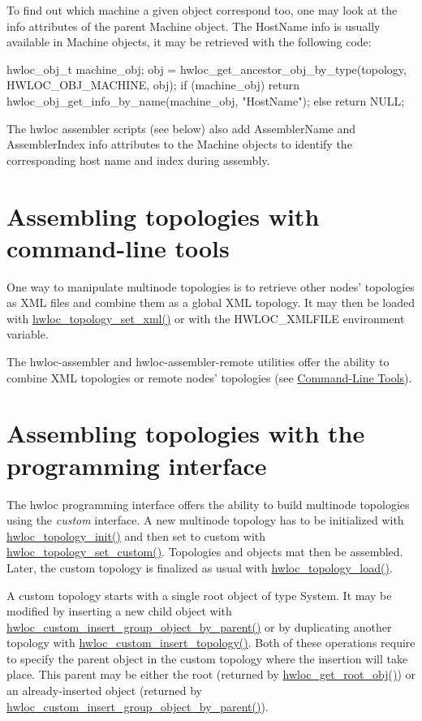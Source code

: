 To find out which machine a given object correspond too, one may look at the info attributes of the parent Machine object. The {\ttfamily HostName} info is usually available in Machine objects, it may be retrieved with the following code: \begin{DoxyVerb}
  hwloc_obj_t machine_obj;
  obj = hwloc_get_ancestor_obj_by_type(topology, HWLOC_OBJ_MACHINE, obj);
  if (machine_obj)
    return hwloc_obj_get_info_by_name(machine_obj, "HostName");
  else
    return NULL;
\end{DoxyVerb}
 The hwloc assembler scripts (see below) also add {\ttfamily AssemblerName} and {\ttfamily AssemblerIndex} info attributes to the Machine objects to identify the corresponding host name and index during assembly.\hypertarget{a00006_multinode_tools}{}\section{Assembling topologies with command-\/line tools}\label{a00006_multinode_tools}
One way to manipulate multinode topologies is to retrieve other nodes' topologies as XML files and combine them as a global XML topology. It may then be loaded with \hyperlink{a00044_ga93efcc8a962afe1ed23393700682173f}{hwloc\_\-topology\_\-set\_\-xml()} or with the HWLOC\_\-XMLFILE environment variable.

The hwloc-\/assembler and hwloc-\/assembler-\/remote utilities offer the ability to combine XML topologies or remote nodes' topologies (see \hyperlink{a00002}{Command-\/Line Tools}).\hypertarget{a00006_multinode_interface}{}\section{Assembling topologies with the programming interface}\label{a00006_multinode_interface}
The hwloc programming interface offers the ability to build multinode topologies using the {\itshape custom\/} interface. A new multinode topology has to be initialized with \hyperlink{a00043_ga5c2d6f476af87005c7bd0811d4548b9f}{hwloc\_\-topology\_\-init()} and then set to custom with \hyperlink{a00044_ga12024fec46f9368fb8fc5c624089c5ec}{hwloc\_\-topology\_\-set\_\-custom()}. Topologies and objects mat then be assembled. Later, the custom topology is finalized as usual with \hyperlink{a00043_ga91e2e6427b95fb7339c99dbbef996e71}{hwloc\_\-topology\_\-load()}.

A custom topology starts with a single root object of type System. It may be modified by inserting a new child object with \hyperlink{a00051_gac1037fe389bfa7c2bf0e3739b7e20844}{hwloc\_\-custom\_\-insert\_\-group\_\-object\_\-by\_\-parent()} or by duplicating another topology with \hyperlink{a00051_ga59ccf6a63cb23d63940e8b782059d9cb}{hwloc\_\-custom\_\-insert\_\-topology()}. Both of these operations require to specify the parent object in the custom topology where the insertion will take place. This parent may be either the root (returned by \hyperlink{a00053_gadbf58f6e187efbdb3cd9a8e30311b7d7}{hwloc\_\-get\_\-root\_\-obj()}) or an already-\/inserted object (returned by \hyperlink{a00051_gac1037fe389bfa7c2bf0e3739b7e20844}{hwloc\_\-custom\_\-insert\_\-group\_\-object\_\-by\_\-parent()}).

